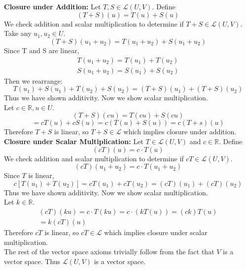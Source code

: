 \documentclass[]{article}
\newcommand{\reals}{\mathbb{R}}
\newcommand{\linears}{\mathcal{L}}
\begin{document}
\section{}
\textbf{Closure under Addition:} Let $T, S \in \linears(U,V)$. Define
\[ (T+S)(u) = T(u) + S(u) \]
We check addition and scalar multiplication to determine if $T + S \in \linears(U,V)$.\\
Take any $u_1,u_2 \in U$.
\[ (T+S)(u_1 + u_2) = T(u_1 + u_2) + S(u_1 + u_2) \]
Since T and S are linear,
\begin{align*}
	T(u_1 + u_2) = T(u_1) + T(u_2)\\
	S(u_1 + u_2) = S(u_1) + S(u_2)
\end{align*}
Then we rearrange:
\[ T(u_1) + S(u_1) + T(u_2) + S(u_2) = (T + S)(u_1) + (T + S)(u_2) \]
Thus we have shown additivity. Now we show scalar multiplication.\\
Let $c \in \reals, u \in U$.
\[ (T + S)(cu) = T(cu) + S(cu) \]
\[ = cT(u) + cS(u) = c(T(u) + S(u)) = c(T+s)(u) \]
Therefore $T + S$ is linear, so $T + S \in \linears$ which implies closure under addition.\\
\textbf{Closure under Scalar Multiplication:} Let $T \in \linears(U,V)$ and $c \in \reals$. Define
\[ (cT)(u) = c\cdot T(u) \]
We check addition and scalar multiplication to determine if $cT \in \linears(U,V)$.\\
\[ (cT)(u_1 + u_2) = c \cdot T(u_1 + u_2) \]
Since $T$ is linear,
\[ c[T(u_1) + T(u_2)] = cT(u_1) + cT(u_2) = (cT)(u_1) + (cT)(u_2) \]
Thus we have shown additivity. Now we show scalar multiplication.\\
Let $k \in \reals$.
\begin{align*}
	(cT)(ku) = c \cdot T(ku) = c \cdot (kT(u)) = (ck)T(u)\\
	= k(cT)(u)
\end{align*}
Therefore $cT$ is linear, so $cT \in \linears$ which implies closure under scalar multiplication.\\
The rest of the vector space axioms trivially follow from the fact that $V$ is a vector space. Thus $\linears(U,V)$ is a vector space.
\end{document}
